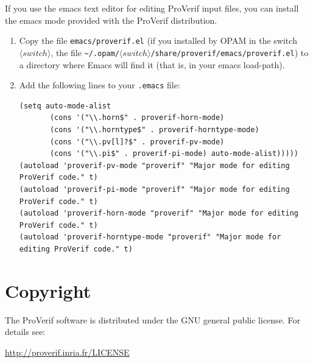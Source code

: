 \documentclass{book}
\newcommand{\nonterm}[1]{\langle\mathit{#1}\rangle}
\newcommand{\switchdir}{\nonterm{switch}}
\newcommand{\opamsubdir}[1]{\nolinkurl{~/.opam/}$\switchdir$\nolinkurl{/#1}}
\begin{document}
If you use the emacs text editor for editing ProVerif input
files, you can install the emacs mode provided with the ProVerif distribution.
\begin{enumerate}

\item Copy the file \texttt{emacs/proverif.el} (if you installed by OPAM
in the switch $\switchdir$, the file \opamsubdir{share/proverif/emacs/proverif.el})
to a directory where Emacs will find it
(that is, in your emacs load-path).

\item Add the following lines to your \texttt{.emacs} file:
\begin{verbatim}
(setq auto-mode-alist
       (cons '("\\.horn$" . proverif-horn-mode)
       (cons '("\\.horntype$" . proverif-horntype-mode)
       (cons '("\\.pv[l]?$" . proverif-pv-mode)
       (cons '("\\.pi$" . proverif-pi-mode) auto-mode-alist)))))
(autoload 'proverif-pv-mode "proverif" "Major mode for editing ProVerif code." t)
(autoload 'proverif-pi-mode "proverif" "Major mode for editing ProVerif code." t)
(autoload 'proverif-horn-mode "proverif" "Major mode for editing ProVerif code." t)
(autoload 'proverif-horntype-mode "proverif" "Major mode for editing ProVerif code." t)
\end{verbatim}
\end{enumerate}



\section{Copyright}

The ProVerif software is distributed under the GNU general public license. For details see:
%
\begin{center}
	\url{http://proverif.inria.fr/LICENSE}
\end{center}

\end{document}
